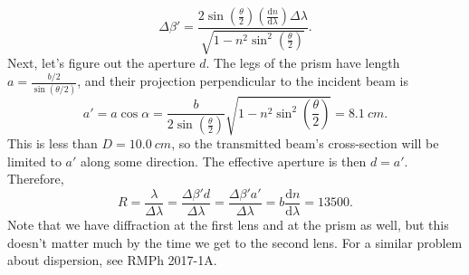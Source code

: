 \documentclass[../TST.tex]{subfiles}
\begin{document}
\begin{solution}
\begin{equation*}
	\Delta\beta'=\frac{2\sin\!{\left(\frac{\theta}{2}\right)\left( \frac{\mathrm{d}n}{\mathrm{d}\lambda}\right)\Delta\lambda}}{\sqrt{1-n^2\sin^2\left(\frac{\theta}{2}\right) }}
.
\end{equation*}
Next, let's figure out the aperture $d$. The legs of the prism have length $a=\frac{b/2}{\sin{(\theta/2)}} $, and their projection perpendicular to the incident beam is 
\begin{equation*}
	a'=a\cos{\alpha}=\frac{b}{2\sin{\left(\frac{\theta}{2}\right)}}\sqrt{1-n^2\sin^2\left(\frac{\theta}{2}\right) }=\qty{8.1}{cm}.
\end{equation*}
This is less than $D=\qty{10.0}{cm}$, so the transmitted beam's cross-section will be limited to $a'$ along some direction. The effective aperture is then $d=a'$. Therefore,
\begin{equation*}
	R=\frac{\lambda}{\Delta \lambda}= \frac{\Delta\beta' d}{\Delta \lambda}=\frac{\Delta\beta' a'}{\Delta \lambda} = \boxed{b \frac{\mathrm{d}n}{\mathrm{d}\lambda}=13500.}
\end{equation*}
Note that we have diffraction at the first lens and at the prism as well, but this doesn't matter much by the time we get to the second lens. For a similar problem about dispersion, see RMPh 2017-1A.
\end{solution}
\fi
\end{document}
